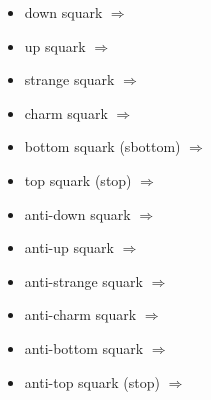 \begin{multicols}{2}
{\begin{itemize}
\item down squark\newline {} $\Rightarrow$ \PSqd
\item up squark\newline {} $\Rightarrow$ \PSqu
\item strange squark\newline {} $\Rightarrow$ \PSqs
\item charm squark\newline {} $\Rightarrow$ \PSqc
\item bottom squark (sbottom)\newline {} $\Rightarrow$ \PSqb
\item top squark (stop)\newline {} $\Rightarrow$ \PSqt
\item anti-down squark\newline {} $\Rightarrow$ \PaSqd
\item anti-up squark\newline {} $\Rightarrow$ \PaSqu
\item anti-strange squark\newline {} $\Rightarrow$ \PaSqs
\item anti-charm squark\newline {} $\Rightarrow$ \PaSqc
\item anti-bottom squark\newline {} $\Rightarrow$ \PaSqb
\item anti-top squark (stop)\newline {} $\Rightarrow$ \PaSqt
\end{itemize}
}\end{multicols}
